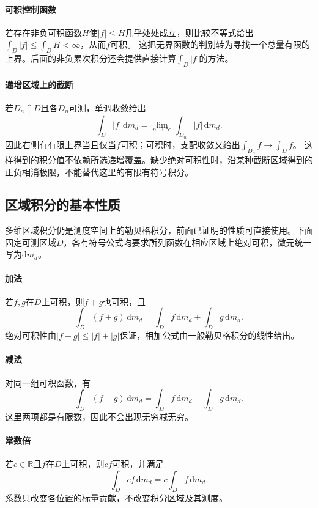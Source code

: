 \paragraph{可积控制函数}

若存在非负可积函数$H$使$|f|\leq H$几乎处处成立，则比较不等式给出$\int_D|f|\leq\int_DH<\infty$，从而$f$可积。
这把无界函数的判别转为寻找一个总量有限的上界。后面的非负累次积分还会提供直接计算$\int_D|f|$的方法。

\paragraph{递增区域上的截断}

若$D_n\uparrow D$且各$D_n$可测，单调收敛给出
\[
 \int_D|f|\,\mathrm dm_d
 =\lim_{n\to\infty}\int_{D_n}|f|\,\mathrm dm_d.
\]
因此右侧有有限上界当且仅当$f$可积；可积时，支配收敛又给出$\int_{D_n}f\to\int_Df$。
这样得到的积分值不依赖所选递增覆盖。缺少绝对可积性时，沿某种截断区域得到的正负相消极限，不能替代这里的有限有符号积分。

\subsection{区域积分的基本性质}

多维区域积分仍是测度空间上的勒贝格积分，前面已证明的性质可直接使用。下面固定可测区域$D$，各有符号公式均要求所列函数在相应区域上绝对可积，微元统一写为$\mathrm dm_d$。

\paragraph{加法}

若$f,g$在$D$上可积，则$f+g$也可积，且
\[
 \int_D(f+g)\,\mathrm dm_d=\int_Df\,\mathrm dm_d+\int_Dg\,\mathrm dm_d.
\]
绝对可积性由$|f+g|\leq|f|+|g|$保证，相加公式由一般勒贝格积分的线性给出。

\paragraph{减法}

对同一组可积函数，有
\[
 \int_D(f-g)\,\mathrm dm_d=\int_Df\,\mathrm dm_d-\int_Dg\,\mathrm dm_d.
\]
这里两项都是有限数，因此不会出现无穷减无穷。

\paragraph{常数倍}

若$c\in\mathbb R$且$f$在$D$上可积，则$cf$可积，并满足
\[
 \int_Dcf\,\mathrm dm_d=c\int_Df\,\mathrm dm_d.
\]
系数只改变各位置的标量贡献，不改变积分区域及其测度。

